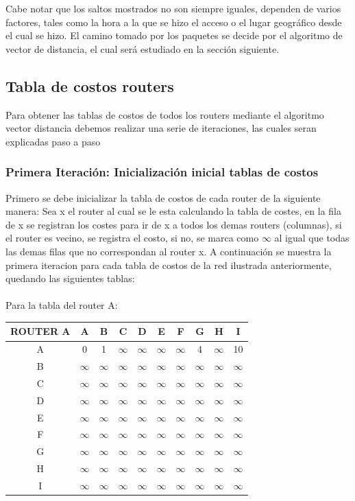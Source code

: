\documentclass{article}
\begin{document}
Cabe notar que los saltos mostrados no son siempre iguales, dependen de varios factores, tales como la hora a la que se hizo el acceso o el lugar geográfico desde el cual se hizo. El camino tomado por los paquetes se decide por el algoritmo de vector de distancia, el cual será estudiado en la sección siguiente.
\clearpage

\subsection{Tabla de costos routers}
Para obtener las tablas de costos de todos los routers mediante el algoritmo vector distancia debemos realizar una serie de iteraciones, las cuales seran explicadas paso a paso

\subsubsection*{Primera Iteración: Inicialización inicial tablas de costos}
Primero se debe inicializar la tabla de costos de cada router de la siguiente manera: Sea x el router al cual se le esta calculando la tabla de costes, en la fila de x se registran los costes para ir de x a todos los demas routers (columnas), si el router es vecino, se registra el costo, si no, se marca como $\infty$ al igual que todas las demas filas que no correspondan al router x. A continuación se muestra la primera iteracion para cada tabla de costos de la red ilustrada anteriormente, quedando las siguientes tablas:\\
\\
Para la tabla del router A:\\
\begin{tabular}{ | c | c | c | c | c | c | c | c | c | c |}
\hline                 
ROUTER A    & A      & B      & C      & D      & E      & F      & G      & H      & I      \\
\hline
        A   & 0      & 1      &$\infty$&$\infty$&$\infty$&$\infty$& 4      &$\infty$& 10     \\
\hline
        B   &$\infty$&$\infty$&$\infty$&$\infty$&$\infty$&$\infty$&$\infty$&$\infty$&$\infty$\\
\hline
        C   &$\infty$&$\infty$&$\infty$&$\infty$&$\infty$&$\infty$&$\infty$&$\infty$&$\infty$\\
\hline
        D   &$\infty$&$\infty$&$\infty$&$\infty$&$\infty$&$\infty$&$\infty$&$\infty$&$\infty$\\
\hline
        E   &$\infty$&$\infty$&$\infty$&$\infty$&$\infty$&$\infty$&$\infty$&$\infty$&$\infty$\\
\hline
        F   &$\infty$&$\infty$&$\infty$&$\infty$&$\infty$&$\infty$&$\infty$&$\infty$&$\infty$\\
\hline
        G   &$\infty$&$\infty$&$\infty$&$\infty$&$\infty$&$\infty$&$\infty$&$\infty$&$\infty$\\
\hline
        H   &$\infty$&$\infty$&$\infty$&$\infty$&$\infty$&$\infty$&$\infty$&$\infty$&$\infty$\\
\hline 
        I   &$\infty$&$\infty$&$\infty$&$\infty$&$\infty$&$\infty$&$\infty$&$\infty$&$\infty$\\
\hline
\end{tabular}
\end{document}
